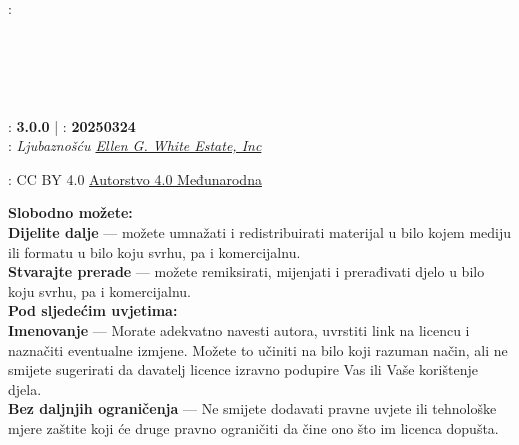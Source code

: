 \clearpage %

{\small
\setlength{\parindent}{0em}\setlength{\parskip}{0.75em}

{\large \emcap{\booktitle}}

: \textbf{\authorname} \\
\ifx\editor\undefined\else\if\relax\detokenize\expandafter{\editor}\relax{} \\ \fi\fi
\ifx\translatedby\undefined\else\if\relax\detokenize\expandafter{\translatedby}\relax{} \\ \fi\fi
\ifx\publisher\undefined\else\if\relax\detokenize\expandafter{\publisher}\relax{} \\ \fi\fi
\ifx\publishingplace\undefined\else\if\relax\detokenize\expandafter{\publishingplace}\relax{} \\ \fi\fi
\ifx\isbn\undefined\else\if\relax\detokenize\expandafter{\isbn}\relax{} \\ \fi\fi
{}: \textbf{3.0.0} | : \textbf{20250324} \\
: \textit{Ljubaznošću \href{https://ellenwhite.org/}{Ellen G. White Estate, Inc}}

\vfill

: \ifepub\else\ccby{}\fi  CC BY 4.0 \href{https://creativecommons.org/licenses/by/4.0/}{Autorstvo 4.0 Međunarodna}

\textbf{Slobodno možete:} \\
\textbf{Dijelite dalje} — možete umnažati i redistribuirati materijal u bilo kojem mediju ili formatu u bilo koju svrhu, pa i komercijalnu. \\
\textbf{Stvarajte prerade} — možete remiksirati, mijenjati i prerađivati djelo u bilo koju svrhu, pa i komercijalnu.\\ 

\textbf{Pod sljedećim uvjetima:} \\
\textbf{Imenovanje} — Morate adekvatno navesti autora, uvrstiti link na licencu i naznačiti eventualne izmjene. Možete to učiniti na bilo koji razuman način, ali ne smijete sugerirati da davatelj licence izravno podupire Vas ili Vaše korištenje djela. \\
\textbf{Bez daljnjih ograničenja} — Ne smijete dodavati pravne uvjete ili tehnološke mjere zaštite koji će druge pravno ograničiti da čine ono što im licenca dopušta.

}

